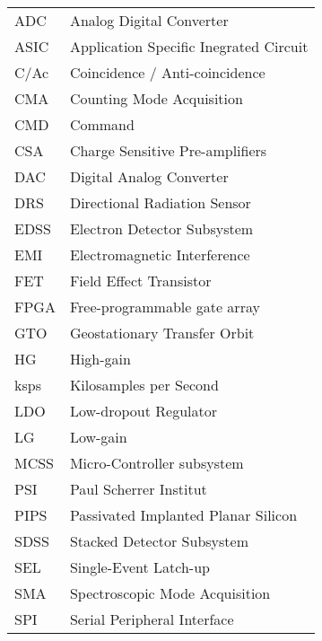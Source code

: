 \begin{center}
\begin{tabular}{p{2cm}p{8cm}}
	ADC & Analog Digital Converter \\
	ASIC & Application Specific Inegrated Circuit \\
    C/Ac & Coincidence / Anti-coincidence \\
    CMA & Counting Mode Acquisition \\
    CMD & Command					\\
	CSA & Charge Sensitive Pre-amplifiers \\
	DAC & Digital Analog Converter \\
	DRS & Directional Radiation Sensor \\
	EDSS & Electron Detector Subsystem \\
	EMI & Electromagnetic Interference \\
	FET & Field Effect Transistor \\
    FPGA & Free-programmable gate array \\
	GTO & Geostationary Transfer Orbit \\
    HG & High-gain \\
    ksps & Kilosamples per Second \\
	LDO & Low-dropout Regulator \\
    LG & Low-gain \\
    MCSS & Micro-Controller subsystem \\
	PSI & Paul Scherrer Institut \\
	PIPS & Passivated Implanted Planar Silicon \\
	SDSS & Stacked Detector Subsystem \\
	SEL & Single-Event Latch-up \\
    SMA & Spectroscopic Mode Acquisition \\
	SPI & Serial Peripheral Interface \\
\end{tabular}
\end{center}
